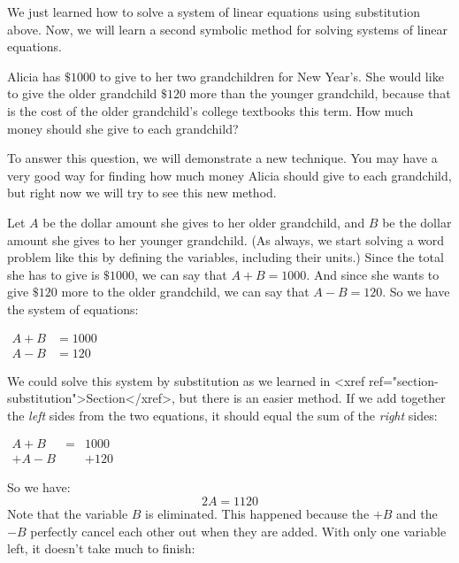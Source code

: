 \documentclass[nooutcomes]{ximera}
\begin{document}
 We just  learned how to solve a system of linear equations using substitution above. Now, 
      we will learn a second symbolic method for solving systems of linear equations.
\begin{example}
 Alicia has $\$1000$ to give to her two grandchildren for New Year's.
        She would like to give the older grandchild $\$120$ more than the younger grandchild,
        because that is the cost of the older grandchild's college textbooks this term.
        How much money should she give to each grandchild?

    To answer this question, we will demonstrate a new technique.
        You may have a very good way for finding how much money Alicia should give to each grandchild,
        but right now we will try to see this new method.

 Let $A$ be the dollar amount she gives to her older grandchild,
        and $B$ be the dollar amount she gives to her younger grandchild.
        (As always, we start solving a word problem like this by defining the variables,
        including their units.)
        Since the total she has to give is $\$1000$,
        we can say that $A+B=1000$.
        And since she wants to give $\$120$ more to the older grandchild,
        we can say that $A-B=120$.
        So we have the system of equations:
    \begin{center}
$
          \begin{aligned}
          A+B & = 1000 \\
          A-B & = 120
          \end{aligned}
$
\end{center}
 We could solve this system by substitution as we learned in <xref ref="section-substitution">Section</xref>,
        but there is an easier method.
        If we add together the \textit{left}
        sides from the two equations,
        it should equal the sum of the \textit{right} sides:
\begin{center}
$
           \begin{array}{rcl}
A+B &=&1000\\
+A-B & & +120
\end{array}
          $
\end{center}
So we have:
$$
          2A=1120
$$
Note that the variable $B$ is eliminated.
        This happened because the $+B$
        and the $-B$
        perfectly cancel each other out when they are added.
        With only one variable left, it doesn't take much to finish:
\begin{center}

\end{center}
\end{example}
\end{document}
